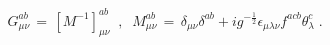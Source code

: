 \begin{equation}\label{eq:defg}
G_{\mu\nu}^{ab} \,=\, [ M^{-1} ]_{\mu\nu}^{ab}
\;\;,\;\;
M_{\mu\nu}^{ab}\,=\, \delta_{\mu\nu}\delta^{ab} + i g^{-\frac{1}{2}}
\epsilon_{\mu\lambda\nu} f^{acb} \theta_\lambda^c\;.
\end{equation}

